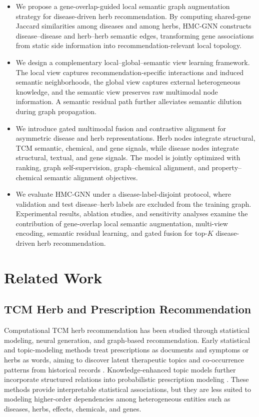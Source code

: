 \documentclass[journal,twoside,web]{ieeecolor}
\begin{document}
\begin{itemize}
\item We propose a gene-overlap-guided local semantic graph augmentation strategy for disease-driven herb recommendation. By computing shared-gene Jaccard similarities among diseases and among herbs, HMC-GNN constructs disease--disease and herb--herb semantic edges, transforming gene associations from static side information into recommendation-relevant local topology.
\item We design a complementary local--global--semantic view learning framework. The local view captures recommendation-specific interactions and induced semantic neighborhoods, the global view captures external heterogeneous knowledge, and the semantic view preserves raw multimodal node information. A semantic residual path further alleviates semantic dilution during graph propagation.
\item We introduce gated multimodal fusion and contrastive alignment for asymmetric disease and herb representations. Herb nodes integrate structural, TCM semantic, chemical, and gene signals, while disease nodes integrate structural, textual, and gene signals. The model is jointly optimized with ranking, graph self-supervision, graph--chemical alignment, and property--chemical semantic alignment objectives.
\item We evaluate HMC-GNN under a disease-label-disjoint protocol, where validation and test disease--herb labels are excluded from the training graph. Experimental results, ablation studies, and sensitivity analyses examine the contribution of gene-overlap local semantic augmentation, multi-view encoding, semantic residual learning, and gated fusion for top-$K$ disease-driven herb recommendation.
\end{itemize}

\section{Related Work}
\label{sec:related_work}

\subsection{TCM Herb and Prescription Recommendation}

Computational TCM herb recommendation has been studied through statistical modeling, neural generation, and graph-based recommendation. Early statistical and topic-modeling methods treat prescriptions as documents and symptoms or herbs as words, aiming to discover latent therapeutic topics and co-occurrence patterns from historical records \cite{ref21,ref22,ref23,ref24,ref25}. Knowledge-enhanced topic models further incorporate structured relations into probabilistic prescription modeling \cite{ref26}. These methods provide interpretable statistical associations, but they are less suited to modeling higher-order dependencies among heterogeneous entities such as diseases, herbs, effects, chemicals, and genes.
\end{document}
